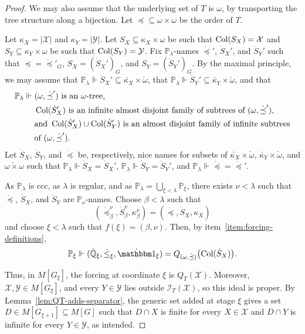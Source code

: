 \begin{proof}
We may also assume that the underlying set of $T$ is $\omega$, by transporting
the tree structure along a bijection.
Let $\preceq\subseteq \omega\times \omega$ be the order of $T$.

Let $\kappa_X=|\mathcal X|$ and $\kappa_Y=|\mathcal Y|$.
Let $S_X\subseteq \kappa_X\times \omega$ be such that $\operatorname{Col}(S_X)=\mathcal X$ and $S_Y\subseteq \kappa_Y\times \omega$ be such that $\operatorname{Col}(S_Y)=\mathcal Y$.
Fix $\mathbb P_\lambda$-names $\dot\preceq'$, $\dot S_X'$, and $\dot S_Y'$ such that
$\preceq=\dot\preceq'_G$, $S_X=(\dot S_X')_G$, and $S_Y=(\dot S_Y')_G$.
By the maximal principle, we may assume that $\mathbb P_\lambda\Vdash \dot S_X'\subseteq \check{\kappa_X}\times\check\omega$, that $\mathbb P_\lambda\Vdash \dot S_Y'\subseteq \check{\kappa_Y}\times\check\omega$, and that
\[
\begin{aligned}
  \mathbb P_\lambda\Vdash{}&(\omega,\dot\preceq')\text{ is an }\omega\text{-tree,}\\
  &\operatorname{Col}(\dot S_X')\text{ is an infinite almost disjoint family of subtrees of }(\omega,\dot\preceq'),\\
  &\text{and }\operatorname{Col}(\dot S_X')\cup\operatorname{Col}(\dot S_Y')\text{ is an almost disjoint family of infinite subtrees}\\
  &\text{of }(\omega,\dot\preceq').
\end{aligned}
\]
Let $\dot S_X$, $\dot S_Y$, and $\dot\preceq$ be, respectively, nice names for subsets of $\check{\kappa_X}\times\check\omega$, $\check{\kappa_Y}\times\check\omega$, and $\check{\omega\times\omega}$ such that $\mathbb P_\lambda\Vdash \dot S_X=\dot S_X'$, $\mathbb P_\lambda\Vdash \dot S_Y=\dot S_Y'$, and $\mathbb P_\lambda\Vdash \dot\preceq=\dot\preceq'$.


As $\mathbb P_\lambda$ is ccc, as $\lambda$ is regular, and as
$\mathbb P_\lambda=\bigcup_{\xi<\lambda}\mathbb P_\xi$, there exists
$\nu<\lambda$ such that $\dot{\preceq}$, $\dot S_X$, and
$\dot S_Y$ are $\mathbb P_\nu$-names.
Choose $\beta<\lambda$ such that
\[
  (\dot{\preceq}^\nu_\beta,\dot S^\nu_\beta,\kappa^\nu_\beta)
  =
  (\dot{\preceq},\dot S_X,\kappa_X)
\]
and choose $\xi<\lambda$ such that $f(\xi)=(\beta,\nu)$.
Then, by item~\ref{item:forcing-definitions},
\[
  \mathbb P_\xi\Vdash
  (\dot{\mathbb Q}_\xi,\dot{\leq}_\xi,\dot{\mathbbm 1}_\xi)
  =
  Q_{(\omega,\dot{\preceq})}
  \bigl(\Col(\dot S_X)\bigr).
\]

Thus, in $M[G_\xi]$, the forcing at coordinate $\xi$ is
$Q_T(\mathcal X)$.
Moreover, $\mathcal X,\mathcal Y\in M[G_\xi]$, and every
$Y\in\mathcal Y$ lies outside $\mathcal I_T(\mathcal X)$, so this ideal is
proper.  By Lemma~\ref{lem:QT-adds-separator}, the generic set added at stage
$\xi$ gives a set $D \in M[G_{\xi+1}]\subseteq M[G]$ such that $D\cap X$ is
finite for every $X\in\mathcal X$ and $D\cap Y$ is infinite for every
$Y\in\mathcal Y$, as intended.
\end{proof}
